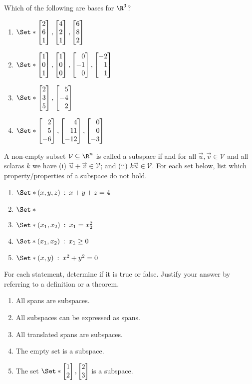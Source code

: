\begin{exercises}
\begin{problist}
		\prob Which of the following are bases for $\R^3$?
		\begin{enumerate}
			\item $\Set*{\mat{2\\6\\1}, \mat{4\\2\\1}, \mat{6\\8\\2}}$
			\item $\Set*{\mat{1\\0\\1}, \mat{1\\0\\0}, \mat{0\\-1\\0}, \mat{-2\\1\\1}}$
			\item $\Set*{\mat{2\\3\\5}, \mat{5\\-4\\2}}$
			\item $\Set*{\mat{2\\5\\-6}, \mat{4\\11\\-12}, \mat{0\\0\\-3}}$
		\end{enumerate}

		\prob
		A non-empty subset $\mathcal V \subseteq \R^n$ is called a subspace if
		and for all $\vec u, \vec v \in \mathcal V$ and all sclaras $k$ we have
			(i) $\vec u + \vec v \in \mathcal V$; and
			(ii) $k\vec u \in \mathcal V$.
			For each set below, list which property/properties of a subspace do not hold.
		\begin{enumerate}
			\item $\Set*{(x,y,z)\given x+y+z=4}$
			\item $\Set*{}$
			\item $\Set*{(x_1,x_2)\given x_1=x_2^2}$
			\item $\Set*{(x_1,x_2)\given x_1 \geq 0}$
			\item $\Set*{(x,y)\given x^2+y^2=0}$
		\end{enumerate}

		\prob  For each statement, determine if it is true or false.
		Justify your answer by referring to a definition or a theorem.
		\begin{enumerate}
			\item All spans are subspaces.
			\item All subspaces can be expressed as spans.
			\item All translated spans are subspaces.
			\item The empty set is a subspace.
			\item The set $\Set*{\mat{1\\2}, \mat{2\\3}}$ is a subspace.
		\end{enumerate}


\end{problist}
\end{exercises}
